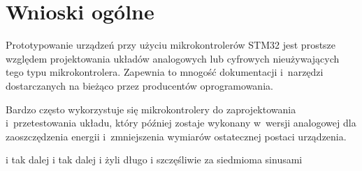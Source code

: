 \section{Wnioski ogólne}
Prototypowanie urządzeń przy użyciu mikrokontrolerów STM32 jest prostsze względem projektowania układów analogowych lub cyfrowych nieużywających tego typu mikrokontrolera. Zapewnia to mnogość dokumentacji i~narzędzi dostarczanych na bieżąco przez producentów oprogramowania.

Bardzo często wykorzystuje się mikrokontrolery do zaprojektowania i~przetestowania układu, który później zostaje wykonany w~wersji analogowej dla zaoszczędzenia energii i~zmniejszenia wymiarów ostatecznej postaci urządzenia.


i tak dalej i tak dalej i żyli długo i szczęśliwie za siedmioma sinusami